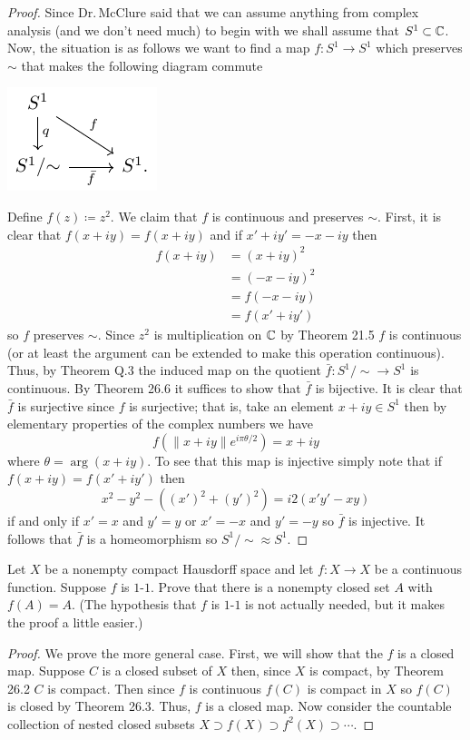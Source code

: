 \begin{proof}
Since Dr.\,McClure said that we can assume anything from complex analysis
(and we don't need much) to begin with we shall assume that
$S^1\subset\mathbb{C}$. Now, the situation is as follows we want to find a map
$f\colon S^1\to S^1$ which preserves $\sim$ that makes the following
diagram commute
\begin{center}
\includegraphics{figures/mid-2-rp-1-s-1}
\end{center}
Define $f(z)\coloneqq z^2$. We claim that $f$ is continuous and preserves
$\sim$. First, it is clear that $f(x+iy)=f(x+iy)$ and
if $x'+iy'=-x-iy$ then
\begin{align*}
f(x+iy)&=(x+iy)^2\\
       &=(-x-iy)^2\\
       &=f(-x-iy)\\
       &=f(x'+iy')
\end{align*}
so $f$ preserves $\sim$. Since $z^2$ is multiplication on $\mathbb{C}$ by Theorem
21.5 $f$ is continuous (or at least the argument can be extended to make
this operation continuous). Thus, by Theorem Q.3 the induced map on the
quotient $\bar f\colon S^1/{\sim}\to S^1$ is continuous. By Theorem 26.6 it
suffices to show that $\bar f$ is bijective. It is clear that $\bar f$ is
surjective since $f$ is surjective; that is, take an element $x+iy\in S^1$
then by elementary properties of the complex numbers we have
\[
f\left(\|x+iy\|e^{i\pi\theta/2}\right)=x+iy
\]
where $\theta=\arg(x+iy)$. To see that this map is injective
simply note that if $f(x+iy)=f(x'+iy')$ then
\[
x^2-y^2-((x')^2+(y')^2)=i2(x'y'-xy)
\]
if and only if $x'=x$ and $y'=y$ or $x'=-x$ and $y'=-y$ so $\bar f$ is
injective. It follows that $\bar f$ is a homeomorphism so
$S^1/{\sim}\approx S^1$.
\end{proof}
\begin{problem}
Let $X$ be a nonempty compact Hausdorff space and let $f\colon
X\to X$ be a continuous function. Suppose $f$ is $1$-$1$. Prove
that there is a nonempty closed set $A$ with $f(A)=A$. (The
hypothesis that $f$ is $1$-$1$ is not actually needed, but it
makes the proof a little easier.)
\end{problem}
\begin{proof}
We prove the more general case. First, we will show that the $f$ is a
closed map. Suppose $C$ is a closed subset of $X$ then, since $X$ is
compact, by Theorem 26.2 $C$ is compact. Then since $f$ is continuous
$f(C)$ is compact in $X$ so $f(C)$ is closed by Theorem 26.3. Thus, $f$ is
a closed map. Now consider the countable collection of nested closed
subsets $X\supset f(X)\supset f^2(X)\supset\cdots$.
\end{proof}
